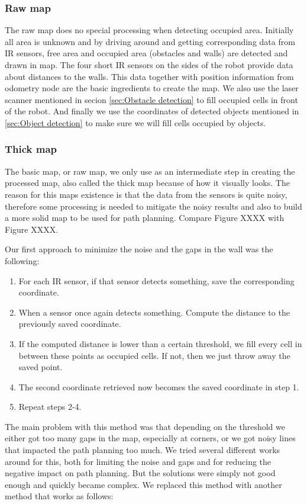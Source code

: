 \subsubsection{Raw map}
The raw map does no special processing when detecting occupied area. Initially all area is unknown and by driving around and getting corresponding data from IR sensors, free area and occupied area (obstacles and walls) are detected and drawn in map. The four short IR sensors on the sides of the robot provide data about distances to the walls. This data together with position information from odometry node are the basic ingredients to create the map.
We also use the laser scanner mentioned in secion \ref{sec:Obstacle detection} to fill occupied cells in front of the robot. And finally we use the coordinates of detected objects mentioned in \ref{sec:Object detection} to make sure we will fill cells occupied by objects.

\subsubsection{Thick map}
The basic map, or raw map, we only use as an intermediate step in creating the processed map, also called the thick map because of how it visually looks. The reason for this maps existence is that the data from the sensors is quite noisy, therefore some processing is needed to mitigate the noisy results and also to build a more solid map to be used for path planning. Compare Figure XXXX with Figure XXXX.

Our first approach to minimize the noise and the gaps in the wall was the following:

\begin{enumerate}
\item For each IR sensor, if that sensor detects something, save the corresponding coordinate.
\item When a sensor once again detects something. Compute the distance to the previously saved coordinate.
\item If the computed distance is lower than a certain threshold, we fill every cell in between these points as occupied cells. If not, then we just throw away the saved point.
\item The second coordinate retrieved now becomes the saved coordinate in step 1.
\item Repeat steps 2-4.
\end{enumerate}

The main problem with this method was that depending on the threshold we either got too many gaps in the map, especially at corners, or we got noisy lines that impacted the path planning too much. We tried several different works around for this, both for limiting the noise and gaps and for reducing the negative impact on path planning. But the solutions were simply not good enough and quickly became complex. We replaced this method with another method that works as follows:

